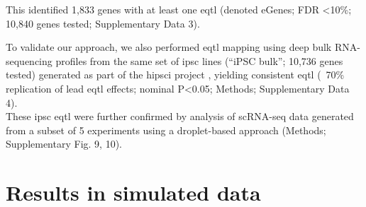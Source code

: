 This identified 1,833 genes with at least one \gls{eqtl} (denoted eGenes; FDR <10\%; 10,840 genes tested; Supplementary Data 3). 


To validate our approach, we also performed \gls{eqtl} mapping using deep bulk RNA-sequencing profiles from the same set of \gls{ipsc} lines (“iPSC bulk”; 10,736 genes tested) generated as part of the \gls{hipsci} project \cite{kilpinen2017common}, yielding consistent \gls{eqtl} (~70\% replication of lead \gls{eqtl} effects; nominal P<0.05; Methods; Supplementary Data 4).\\ 

These \gls{ipsc} \gls{eqtl} were further confirmed by analysis of scRNA-seq data generated from a subset of 5 experiments using a droplet-based approach (Methods; Supplementary Fig. 9, 10).


\section{Results in simulated data}





